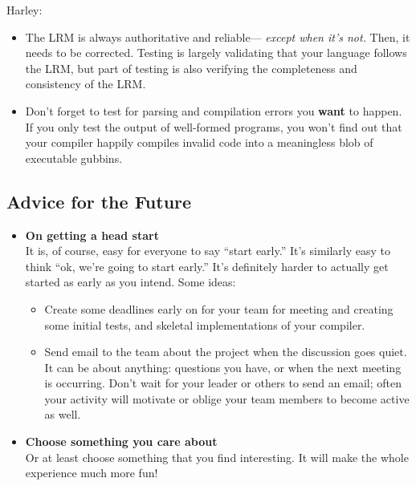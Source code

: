 Harley:
\begin{itemize}
\item The LRM is always authoritative and reliable--- {\it except when it's not.} Then, it needs to be corrected. Testing is largely validating that your language follows the LRM, but part of testing is  also verifying the completeness  and consistency of the LRM. 
\item Don't forget to test for parsing and compilation errors you {\bf want} to happen. If you only test the output of well-formed programs, you won't find out that your compiler happily compiles invalid code into a meaningless blob of executable gubbins.
\end{itemize}

\subsection{Advice for the Future}
\begin{itemize}
\item {\bf On getting a head start}\\
It is, of course, easy for everyone to say ``start early.'' It's similarly easy to think ``ok, we're going to start early.''  It's definitely harder to actually get started as early as you intend. Some ideas:
\begin{itemize}
\item Create some deadlines early on for your team for meeting and creating some initial tests, and skeletal implementations of your compiler. 
\item Send email to the  team about the project when the discussion goes quiet. It can be about anything: questions you have, or when the next meeting is occurring. Don't wait for your leader or others to send an email; often your activity will motivate or oblige your team members to become active as well.
\end{itemize}
\item {\bf Choose something you care about}\\
Or at least choose something that you find interesting. It will make the whole experience much more fun!
\end{itemize}